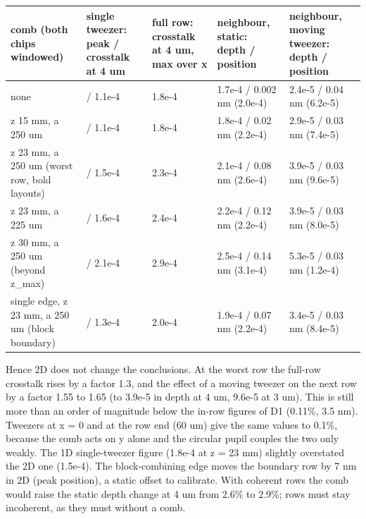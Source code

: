 {\footnotesize
\begin{longtable}[]{@{}>{\raggedright\arraybackslash}p{0.230\dimexpr(\linewidth-10\tabcolsep)\relax}>{\raggedright\arraybackslash}p{0.196\dimexpr(\linewidth-10\tabcolsep)\relax}>{\raggedright\arraybackslash}p{0.191\dimexpr(\linewidth-10\tabcolsep)\relax}>{\raggedright\arraybackslash}p{0.172\dimexpr(\linewidth-10\tabcolsep)\relax}>{\raggedright\arraybackslash}p{0.211\dimexpr(\linewidth-10\tabcolsep)\relax}@{}}
\toprule\noalign{}
comb (both chips windowed) & single tweezer: peak / crosstalk at 4 um &
full row: crosstalk at 4 um, max over x & neighbour, static: depth /
position & neighbour, moving tweezer: depth / position \\
\midrule\noalign{}
\endhead
\bottomrule\noalign{}
\endlastfoot
none & 1 / 1.1e-4 & 1.8e-4 & 1.7e-4 / 0.002 nm (2.0e-4) & 2.4e-5 / 0.04
nm (6.2e-5) \\
z 15 mm, a 250 um & 0.995 / 1.1e-4 & 1.8e-4 & 1.8e-4 / 0.02 nm (2.2e-4)
& 2.9e-5 / 0.03 nm (7.4e-5) \\
z 23 mm, a 250 um (worst row, bold layouts) & 0.990 / 1.5e-4 & 2.3e-4 &
2.1e-4 / 0.08 nm (2.6e-4) & 3.9e-5 / 0.03 nm (9.6e-5) \\
z 23 mm, a 225 um & 0.982 / 1.6e-4 & 2.4e-4 & 2.2e-4 / 0.12 nm (2.2e-4)
& 3.9e-5 / 0.03 nm (8.0e-5) \\
z 30 mm, a 250 um (beyond z\_max) & 0.984 / 2.1e-4 & 2.9e-4 & 2.5e-4 /
0.14 nm (3.1e-4) & 5.3e-5 / 0.03 nm (1.2e-4) \\
single edge, z 23 mm, a 250 um (block boundary) & 0.995 / 1.3e-4 &
2.0e-4 & 1.9e-4 / 0.07 nm (2.2e-4) & 3.4e-5 / 0.03 nm (8.4e-5) \\
\end{longtable}
}

Hence 2D does not change the conclusions. At the worst row the full-row
crosstalk rises by a factor 1.3, and the effect of a moving tweezer on
the next row by a factor 1.55 to 1.65 (to 3.9e-5 in depth at 4 um,
9.6e-5 at 3 um). This is still more than an order of magnitude below the
in-row figures of D1 (0.11\%, 3.5 nm). Tweezers at x = 0 and at the row
end (60 um) give the same values to 0.1\%, because the comb acts on y
alone and the circular pupil couples the two only weakly. The 1D
single-tweezer figure (1.8e-4 at z = 23 mm) slightly overstated the 2D
one (1.5e-4). The block-combining edge moves the boundary row by 7 nm in
2D (peak position), a static offset to calibrate. With coherent rows the
comb would raise the static depth change at 4 um from 2.6\% to 2.9\%;
rows must stay incoherent, as they must without a comb.

